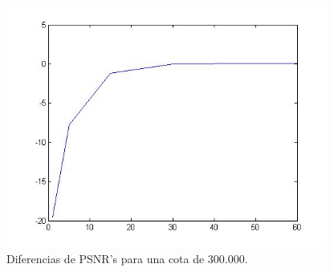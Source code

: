 \documentclass[10pt, a4paper]{article}
\begin{document}
\begin{itemize}
\begin{figure}[H] 
\begin{center}
\includegraphics[width=300pt]{./img3PXY300k.jpg}
\caption[h]{Diferencias de PSNR's para una cota de 300.000.}
\end{center}
\end{figure}



\end{itemize}
\end{document}
